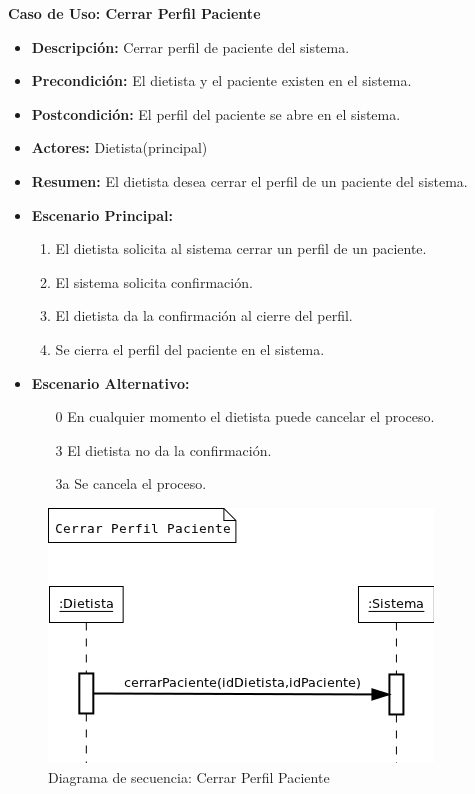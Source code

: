 \textbf{Caso de Uso: Cerrar Perfil Paciente}
\begin{itemize}
\item \textbf{Descripción:} Cerrar perfil de paciente del sistema.
\item \textbf{Precondición:} El dietista y el paciente existen en el sistema.
\item \textbf{Postcondición:} El perfil del paciente se abre en el sistema.
\item \textbf{Actores:} Dietista(principal)
\item \textbf{Resumen:} El dietista desea cerrar el perfil de un paciente del sistema.
\item \textbf{Escenario Principal:}
\begin{enumerate}
\item El dietista solicita al sistema cerrar un perfil de un paciente.
\item El sistema solicita confirmación.
\item El dietista da la confirmación al cierre del perfil.
\item Se cierra el perfil del paciente en el sistema.
\end{enumerate}
\item \textbf{Escenario Alternativo:}
\begin{enumerate}
\item[0] En cualquier momento el dietista puede cancelar el proceso.
\item[3] El dietista no da la confirmación.
\item[3a] Se cancela el proceso.
\end{enumerate}
\end{itemize}
\begin{figure}[H]
  \label{ds_cerrarpaciente}
  \begin{center}
    \includegraphics[scale=0.7]{../img/DS_CerrarPaciente.png}
  \end{center}
  \caption{Diagrama de secuencia: Cerrar Perfil Paciente}
\end{figure}
